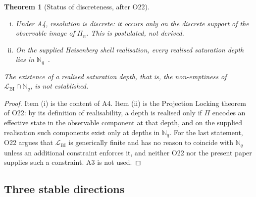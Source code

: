 \documentclass[11pt,a4paper]{article}
\newtheorem{theorem}{Theorem}[section]
\begin{document}
    \begin{theorem}[Status of discreteness, after O22]
      \label{thm:discrete-locking}
      \begin{enumerate}[(i)]
        \item Under A4, resolution is discrete: it occurs only on the discrete support of the observable
        image of $\Pi_n$.
        This is postulated, not derived.
        \item On the supplied Heisenberg shell realisation, every realised saturation depth lies in
        $\mathbb{N}_q$~\cite{Beau2026a26}.
      \end{enumerate}
      The existence of a realised saturation depth, that is, the non-emptiness of
      $\mathcal{L}_{\mathrm{BI}} \cap \mathbb{N}_q$, is not established.
    \end{theorem}

    \begin{proof}
      Item (i) is the content of A4.
      Item (ii) is the Projection Locking theorem of O22: by its definition of realisability, a depth is
      realised only if $\Pi$ encodes an effective state in the observable component at that depth, and on
      the supplied realisation such components exist only at depths in $\mathbb{N}_q$.
      For the last statement, O22 argues that $\mathcal{L}_{\mathrm{BI}}$ is generically finite and has no
      reason to coincide with $\mathbb{N}_q$ unless an additional constraint enforces it, and neither O22 nor
      the present paper supplies such a constraint.
      A3 is not used.
    \end{proof}

  \subsection{Three stable directions}
\end{document}
